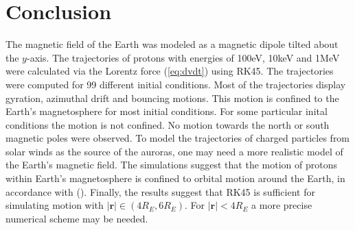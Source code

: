\section{Conclusion}
The magnetic field of the Earth was modeled as a magnetic dipole tilted about the $y$-axis.
The trajectories of protons with energies of 100eV, 10keV and 1MeV were calculated via the Lorentz force (\ref{eq:dvdt}) using RK45. 
The trajectories were computed for 99 different initial conditions.
Most of the trajectories display gyration, azimuthal drift and bouncing motions.
This motion is confined to the Earth's magnetosphere for most initial conditions. 
For some particular inital conditions the motion is not confined.
No motion towards the north or south magnetic poles were observed. 
To model the trajectories of charged particles from solar winds as the source of the auroras, one may need a more realistic model of the Earth's magnetic field. 
The simulations suggest that the motion of protons within Earth's magnetosphere is confined to orbital motion around the Earth, in accordance with (\cite{soni_2021}).
Finally, the results suggest that RK45 is sufficient for simulating motion with $|\bm{r}| \in (4R_E, 6R_E)$. 
For $|\bm{r}| < 4R_E$ a more precise numerical scheme may be needed. 